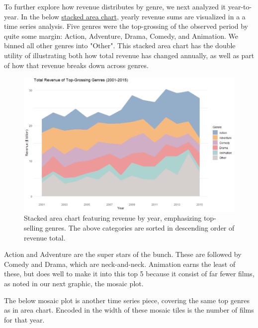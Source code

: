 \documentclass[12pt]{article}
\begin{document}
To further explore how revenue distributes by genre, we next analyzed it year-to-year. In the below \href{https://public.tableau.com/views/area_chart_updated/AreaChart?:language=en-US&:sid=&:display_count=n&:origin=viz_share_link}{stacked area chart}, yearly revenue sums are visualized in a a time series analysis. Five genres were the top-grossing of the observed period by quite some margin: Action, Adventure, Drama, Comedy, and Animation. We binned all other genres into "Other". This stacked area chart has the double utility of illustrating both how total revenue has changed annually, as well as part of how that revenue breaks down across genres.

\begin{figure}[h!]
    \centering
    \includegraphics[width=1\textwidth]{images/stacked_area_chart_revenues_by_yr.png}
    \caption{Stacked area chart featuring revenue by year, emphasizing top-selling genres. The above categories are sorted in descending order of revenue total.}
    \label{fig:figure_1}
\end{figure}

Action and Adventure are the super stars of the bunch. These are followed by Comedy and Drama, which are neck-and-neck. Animation earns the least of these, but does well to make it into this top 5 because it consist of far fewer films, as noted in our next graphic, the mosaic plot.

The below mosaic plot is another time series piece, covering the same top genres as in area chart. Encoded in the width of these mosaic tiles is the number of films for that year.
\end{document}
